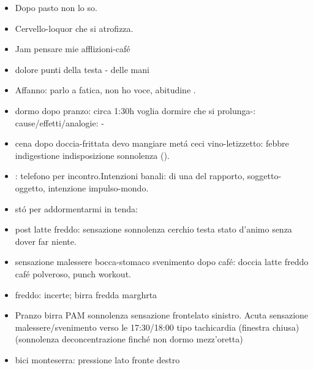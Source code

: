 \begin{itemize}
\item {} Dopo pasto non lo so.

\item Cervello-loquor che si atrofizza.

\item Jam pensare mie afflizioni-caf\'e

\item dolore punti della testa - delle mani

\item Affanno: parlo a fatica, non ho voce, abitudine .

\item dormo dopo pranzo: circa 1:30h voglia dormire che si prolunga-: cause/effetti/analogie:  -

\item cena dopo doccia-frittata devo mangiare met\'a ceci vino-letizzetto: febbre indigestione indisposizione sonnolenza ().

\item {}: telefono per incontro.Intenzioni banali:  di una  del rapporto, soggetto-oggetto, intenzione impulso-mondo.

\item st\'o per addormentarmi in tenda:   

\item post latte freddo: sensazione sonnolenza cerchio testa stato d'animo  senza dover far niente.

\item sensazione malessere bocca-stomaco svenimento dopo caf\'e: doccia latte freddo caf\'e polveroso, punch workout.

\item freddo:  incerte; birra fredda  marghrta

\item Pranzo birra PAM sonnolenza sensazione frontelato sinistro. Acuta sensazione malessere/svenimento verso le 17:30/18:00 tipo tachicardia (finestra chiusa) (sonnolenza deconcentrazione finch\'e non dormo mezz'oretta)

\item bici monteserra: pressione lato fronte destro


\end{itemize}

